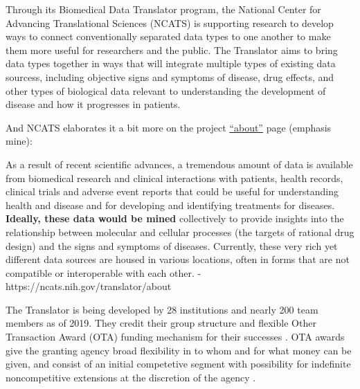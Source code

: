\documentclass[11pt]{article}
\begin{document}
\begin{multicols}{2}
\begin{leftbar}
Through its Biomedical Data Translator program, the National Center for
Advancing Translational Sciences (NCATS) is supporting research to
develop ways to connect conventionally separated data types to one
another to make them more useful for researchers and the public. The
Translator aims to bring data types together in ways that will integrate
multiple types of existing data sourcess, including objective signs and
symptoms of disease, drug effects, and other types of biological data
relevant to understanding the development of disease and how it
progresses in patients. \cite{NIHStrategicPlan2018} 
\end{leftbar}

And NCATS elaborates it a bit more on the project
\href{https://ncats.nih.gov/translator/about}{``about''} page (emphasis
mine):

\begin{leftbar}
As a result of recent scientific advances, a tremendous amount of data
is available from biomedical research and clinical interactions with
patients, health records, clinical trials and adverse event reports that
could be useful for understanding health and disease and for developing
and identifying treatments for diseases. \textbf{Ideally, these data
would be mined} collectively to provide insights into the relationship
between molecular and cellular processes (the targets of rational drug
design) and the signs and symptoms of diseases. Currently, these very
rich yet different data sources are housed in various locations, often
in forms that are not compatible or interoperable with each other. -
https://ncats.nih.gov/translator/about
\end{leftbar}

The Translator is being developed by 28 institutions and nearly 200 team
members as of 2019. They credit their group structure and flexible Other
Transaction Award (OTA) funding mechanism for their successes \cite{consortiumBiomedicalDataTranslator2019} . OTA awards give the
granting agency broad flexibility in to whom and for what money can be
given, and consist of an initial competetive segment with possibility
for indefinite noncompetitive extensions at the discretion of the agency
\cite{fleisherOtherTransactionAward2019} .


\end{multicols}
\end{document}
